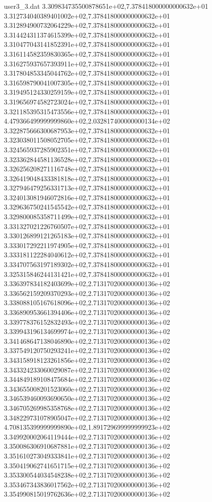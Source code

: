 \begin{filecontents}{user3_3.dat}
3.309834735500878651e+02,7.378418000000000632e+01
3.312734040389401002e+02,7.378418000000000632e+01
3.312894900732064229e+02,7.378418000000000632e+01
3.314424311374615399e+02,7.378418000000000632e+01
3.310477043141852391e+02,7.378418000000000632e+01
3.316114582359830365e+02,7.378418000000000632e+01
3.316275937657393911e+02,7.378418000000000632e+01
3.317804853345044762e+02,7.378418000000000632e+01
3.316598790041007305e+02,7.378418000000000632e+01
3.319495124330259159e+02,7.378418000000000632e+01
3.319656974582723024e+02,7.378418000000000632e+01
3.321185395315473556e+02,7.378418000000000632e+01
4.479366499999999860e+02,2.032817400000000134e+02
3.322875666300687953e+02,7.378418000000000632e+01
3.323038011508052705e+02,7.378418000000000632e+01
3.324565937285902351e+02,7.378418000000000632e+01
3.323362844581136528e+02,7.378418000000000632e+01
3.326256208271116748e+02,7.378418000000000632e+01
3.326419048433381818e+02,7.378418000000000632e+01
3.327946479256331713e+02,7.378418000000000632e+01
3.324013081946072816e+02,7.378418000000000632e+01
3.329636750241545542e+02,7.378418000000000632e+01
3.329800085358711499e+02,7.378418000000000632e+01
3.331327021226760507e+02,7.378418000000000632e+01
3.330126899121265183e+02,7.378418000000000632e+01
3.333017292211974905e+02,7.378418000000000632e+01
3.333181122284040612e+02,7.378418000000000632e+01
3.334707563197189302e+02,7.378418000000000632e+01
3.325315846244131421e+02,7.378418000000000632e+01
3.336397834182403699e+02,2.713170200000000136e+02
3.336562159209370293e+02,2.713170200000000136e+02
3.338088105167618096e+02,2.713170200000000136e+02
3.336890953661394406e+02,2.713170200000000136e+02
3.339778376152832493e+02,2.713170200000000136e+02
3.339943196134699974e+02,2.713170200000000136e+02
3.341468647138046890e+02,2.713170200000000136e+02
3.337549120750293241e+02,2.713170200000000136e+02
3.343158918123261856e+02,2.713170200000000136e+02
3.343324233060029087e+02,2.713170200000000136e+02
3.344849189108475684e+02,2.713170200000000136e+02
3.343655008201523060e+02,2.713170200000000136e+02
3.346539460093690650e+02,2.713170200000000136e+02
3.346705269985358768e+02,2.713170200000000136e+02
3.348229731078905047e+02,2.713170200000000136e+02
4.708135399999999890e+02,1.891729699999999923e+02
3.349920002064119444e+02,2.713170200000000136e+02
3.350086306910687881e+02,2.713170200000000136e+02
3.351610273049333841e+02,2.713170200000000136e+02
3.350419062741651715e+02,2.713170200000000136e+02
3.353300544034548238e+02,2.713170200000000136e+02
3.353467343836017562e+02,2.713170200000000136e+02
3.354990815019762636e+02,2.713170200000000136e+02

\end{filecontents}

